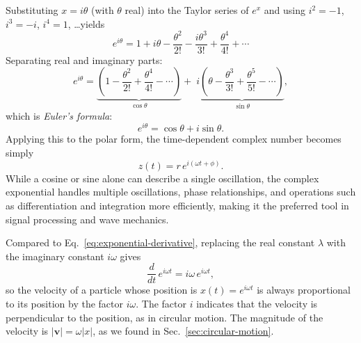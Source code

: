 \documentclass[../main.tex]{subfiles}
\theoremstyle{remark}
\begin{document}
Substituting $x = i\theta$ (with $\theta$ real) into the Taylor series of $e^x$ and
using $i^{2}=-1$, $i^{3}=-i$, $i^{4}=1$, \ldots yields
\begin{equation}
    e^{i\theta}
      = 1 + i\theta - \frac{\theta^{2}}{2!} - \frac{i\theta^{3}}{3!}
        + \frac{\theta^{4}}{4!} + \cdots
\end{equation}
Separating real and imaginary parts:
\begin{equation}
    e^{i\theta}
      = \underbrace{\left(1-\frac{\theta^{2}}{2!}+\frac{\theta^{4}}{4!}-\cdots
                   \right)}_{\cos\theta}
      + \;i\underbrace{\left(\theta-\frac{\theta^{3}}{3!}+\frac{\theta^{5}}{5!}
                             -\cdots\right)}_{\sin\theta},
\end{equation}
which is \emph{Euler's formula}:
\begin{equation}
    e^{i\theta} = \cos\theta + i\sin\theta.
\end{equation}
Applying this to the polar form, the time-dependent complex number becomes simply
\begin{equation}
    z(t) = r\,e^{i(\omega t+\phi)}.
\end{equation}
While a cosine or sine alone can describe a single oscillation, the complex exponential
handles multiple oscillations, phase relationships, and operations such as differentiation
and integration more efficiently, making it the preferred tool in signal processing and
wave mechanics.


Compared to Eq.~\eqref{eq:exponential-derivative}, replacing the real constant $\lambda$ with the imaginary constant $i\omega$ gives
\begin{equation}
    \frac{d}{dt}\,e^{i\omega t} = i\omega\,e^{i\omega t},
\end{equation}
so the velocity of a particle whose position is $x(t)=e^{i\omega t}$ is always proportional to its position by the factor $i\omega$. The factor $i$ indicates that the velocity is perpendicular to the position, as in circular motion. The magnitude of the velocity is $|\mathbf{v}| = \omega |x|$, as we found in Sec.~\ref{sec:circular-motion}.
\end{document}
